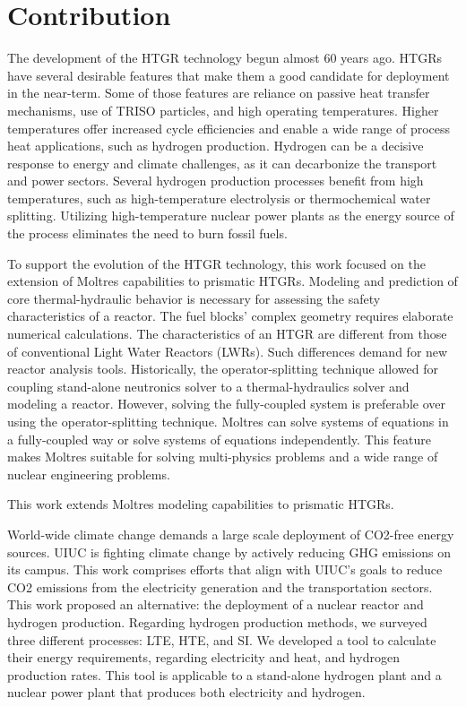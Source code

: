 \section{Contribution}

The development of the HTGR technology begun almost 60 years ago.
HTGRs have several desirable features that make them a good candidate for deployment in the near-term.
Some of those features are reliance on passive heat transfer mechanisms, use of TRISO particles, and high operating temperatures.
Higher temperatures offer increased cycle efficiencies and enable a wide range of process heat applications, such as hydrogen production.
Hydrogen can be a decisive response to energy and climate challenges, as it can decarbonize the transport and power sectors.
Several hydrogen production processes benefit from high temperatures, such as high-temperature electrolysis or thermochemical water splitting.
Utilizing high-temperature nuclear power plants as the energy source of the process eliminates the need to burn fossil fuels.

To support the evolution of the HTGR technology, this work focused on the extension of Moltres capabilities to prismatic HTGRs.
Modeling and prediction of core thermal-hydraulic behavior is necessary for assessing the safety characteristics of a reactor.
The fuel blocks’ complex geometry requires elaborate numerical calculations.
The characteristics of an HTGR are different from those of conventional Light Water Reactors (LWRs).
Such differences demand for new reactor analysis tools.
Historically, the operator-splitting technique allowed for coupling stand-alone neutronics solver to a thermal-hydraulics solver and modeling a reactor.
However, solving the fully-coupled system is preferable over using the operator-splitting technique.
Moltres can solve systems of equations in a fully-coupled way or solve systems of equations independently. This feature makes Moltres suitable for solving multi-physics problems and a wide range of nuclear engineering problems.

This work extends Moltres modeling capabilities to prismatic HTGRs.





World-wide climate change demands a large scale deployment of \gls{CO2}-free energy sources.
UIUC is fighting climate change by actively reducing GHG emissions on its campus.
This work comprises efforts that align with UIUC's goals to reduce \gls{CO2} emissions from the electricity generation and the transportation sectors.
This work proposed an alternative: the deployment of a nuclear reactor and hydrogen production.
Regarding hydrogen production methods, we surveyed three different processes: LTE, HTE, and SI.
We developed a tool to calculate their energy requirements, regarding electricity and heat, and hydrogen production rates.
This tool is applicable to a stand-alone hydrogen plant and a nuclear power plant that produces both electricity and hydrogen.

